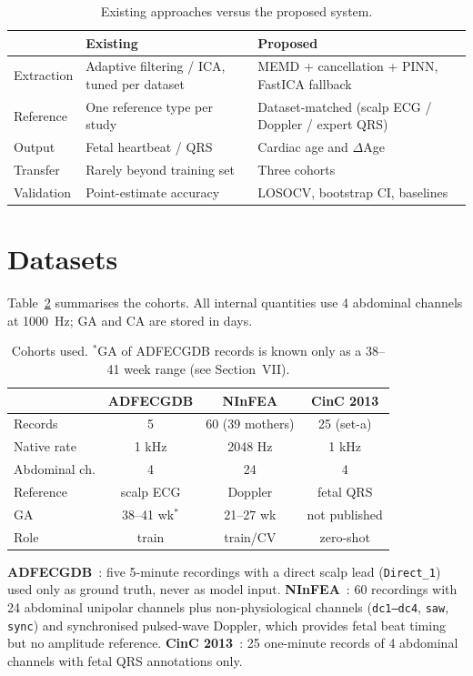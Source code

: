 \documentclass[journal]{IEEEtran}
\begin{document}
\begin{table}[!t]
\caption{Existing approaches versus the proposed system.}
\label{tab:existing}
\centering
\small
\begin{tabular}{@{}p{1.6cm}p{2.9cm}p{3.2cm}@{}}
\toprule
 & Existing & Proposed \\
\midrule
Extraction & Adaptive filtering / ICA, tuned per dataset & MEMD + cancellation + PINN, FastICA fallback \\
Reference & One reference type per study & Dataset-matched (scalp ECG / Doppler / expert QRS) \\
Output & Fetal heartbeat / QRS & Cardiac age and $\Delta$Age \\
Transfer & Rarely beyond training set & Three cohorts \\
Validation & Point-estimate accuracy & LOSOCV, bootstrap CI, baselines \\
\bottomrule
\end{tabular}
\end{table}

\section{Datasets}
Table~\ref{tab:data} summarises the cohorts. All internal quantities use 4 abdominal channels at 1000~Hz; GA and CA are stored in days.

\begin{table}[!t]
\caption{Cohorts used. $^{*}$GA of ADFECGDB records is known only as a 38--41 week range (see Section~VII).}
\label{tab:data}
\centering
\small
\begin{tabular}{@{}lccc@{}}
\toprule
 & ADFECGDB & NInFEA & CinC 2013 \\
\midrule
Records & 5 & 60 (39 mothers) & 25 (set-a) \\
Native rate & 1 kHz & 2048 Hz & 1 kHz \\
Abdominal ch. & 4 & 24 & 4 \\
Reference & scalp ECG & Doppler & fetal QRS \\
GA & 38--41 wk$^{*}$ & 21--27 wk & not published \\
Role & train & train/CV & zero-shot \\
\bottomrule
\end{tabular}
\end{table}

\textbf{ADFECGDB}~\cite{adfecgdb,goldberger2000}: five 5-minute recordings with a direct scalp lead (\texttt{Direct\_1}) used only as ground truth, never as model input. \textbf{NInFEA}~\cite{sulas2021}: 60 recordings with 24 abdominal unipolar channels plus non-physiological channels (\texttt{dc1--dc4}, \texttt{saw}, \texttt{sync}) and synchronised pulsed-wave Doppler, which provides fetal beat timing but no amplitude reference. \textbf{CinC 2013}~\cite{silva2013}: 25 one-minute records of 4 abdominal channels with fetal QRS annotations only.
\end{document}
